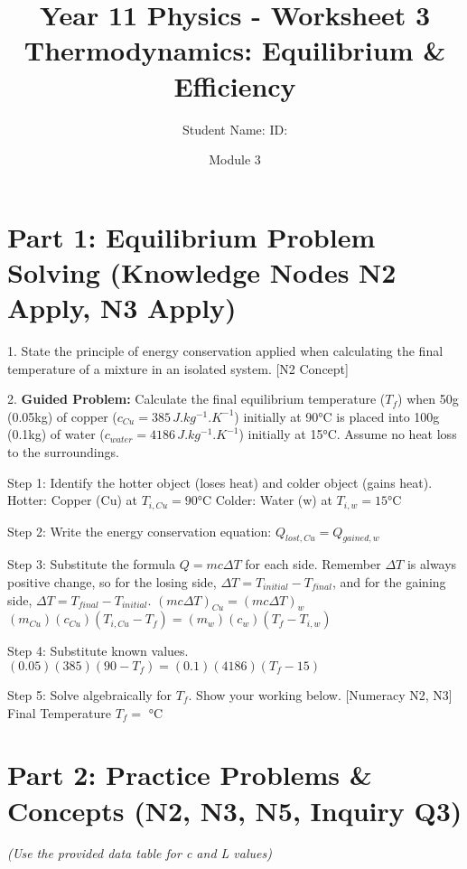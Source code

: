 \documentclass[11pt, a4paper]{article}
\title{Year 11 Physics - Worksheet 3 \\ Thermodynamics: Equilibrium & Efficiency}
\date{Module 3}
\author{Student Name: \underline{\hspace{5cm}} ID: \underline{\hspace{3cm}}} %
\begin{document}
\maketitle

\section*{Part 1: Equilibrium Problem Solving (Knowledge Nodes N2 Apply, N3 Apply)}

1.  State the principle of energy conservation applied when calculating the final temperature of a mixture in an isolated system. [N2 Concept]
    \vspace{1cm}

2.  \textbf{Guided Problem:} Calculate the final equilibrium temperature ($T_f$) when 50g (0.05kg) of copper ($c_{Cu} = 385 \, \si{J.kg^{-1}.K^{-1}}$) initially at 90\si{\celsius} is placed into 100g (0.1kg) of water ($c_{water} = 4186 \, \si{J.kg^{-1}.K^{-1}}$) initially at 15\si{\celsius}. Assume no heat loss to the surroundings.

    Step 1: Identify the hotter object (loses heat) and colder object (gains heat).
    Hotter: Copper (Cu) at $T_{i,Cu} = 90\si{\celsius}$
    Colder: Water (w) at $T_{i,w} = 15\si{\celsius}$

    Step 2: Write the energy conservation equation: $Q_{lost, Cu} = Q_{gained, w}$

    Step 3: Substitute the formula $Q=mc\Delta T$ for each side. Remember $\Delta T$ is always positive change, so for the losing side, $\Delta T = T_{initial} - T_{final}$, and for the gaining side, $\Delta T = T_{final} - T_{initial}$.
    $(m c \Delta T)_{Cu} = (m c \Delta T)_{w}$
    $(m_{Cu})(c_{Cu})(T_{i,Cu} - T_f) = (m_w)(c_w)(T_f - T_{i,w})$

    Step 4: Substitute known values.
    $(0.05)(385)(90 - T_f) = (0.1)(4186)(T_f - 15)$

    Step 5: Solve algebraically for $T_f$. Show your working below. [Numeracy N2, N3]
    \vspace{5cm}
    Final Temperature $T_f = $ \underline{\hspace{2cm}} \si{\celsius}

\section*{Part 2: Practice Problems & Concepts (N2, N3, N5, Inquiry Q3)}
\textit{(Use the provided data table for c and L values)}
\end{document}
